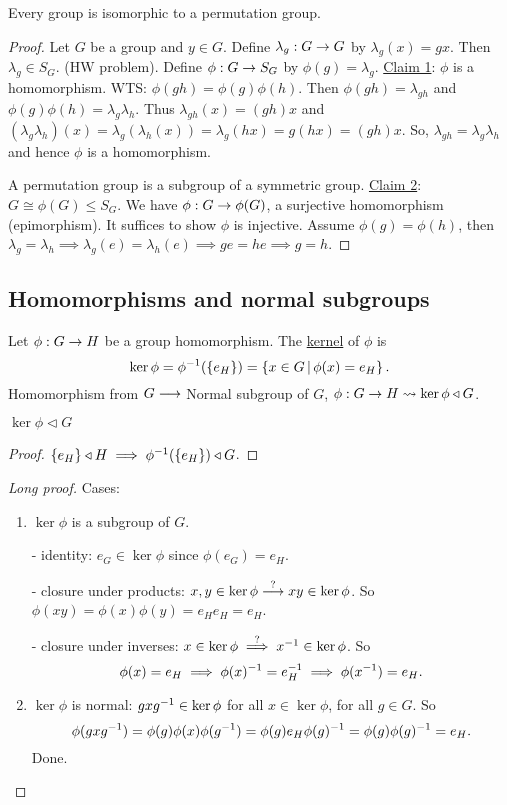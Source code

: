 \documentclass[]{article}
\begin{document}
\begin{theorem}
	Every group is isomorphic to a permutation group.
\end{theorem}
\begin{proof}
	Let $G$ be a group and $y\in G$. Define $\lambda_g:G\rightarrow G$ by $\lambda_g(x) = gx$.
	Then $\lambda_g\in S_G$. (HW problem).
	Define $\phi:G\rightarrow S_G$ by $\phi(g) = \lambda_g$.
	\ul{Claim 1}: $\phi$ is a homomorphism. WTS: $\phi(gh) = \phi(g)\phi(h)$.
	Then $\phi(gh) = \lambda_{gh}$ and $\phi(g)\phi(h) = \lambda_g\lambda_h$.
	Thus $\lambda_{gh}(x) = (gh)x$ and $(\lambda_g\lambda_h)(x) = \lambda_g(\lambda_h(x)) = \lambda_g(hx) = g(hx) = (gh)x$.
	So, $\lambda_{gh} = \lambda_g\lambda_h$ and hence $\phi$ is a homomorphism.

	A permutation group is a subgroup of a symmetric group.
	\ul{Claim 2}: $G\cong\phi(G)\leq S_G$.
	We have $\phi:G\rightarrow\phi(G)$, a surjective homomorphism (epimorphism).
	It suffices to show $\phi$ is injective.
	Assume $\phi(g) = \phi(h)$, then $\lambda_g = \lambda_h \implies \lambda_g(e) = \lambda_h(e) \implies ge = he \implies g = h$.
\end{proof}

\subsection{Homomorphisms and normal subgroups}

\begin{definition}
	Let $\phi:G\rightarrow H$ be a group homomorphism. The \ul{kernel} of $\phi$ is $$\ker\phi = \phi^{-1}(\{e_H\}) = \left\{ x\in G \, \middle| \, \phi(x)=e_H \right\}.$$
	Homomorphism from $G\longrightarrow $ Normal subgroup of $G$, $\phi:G\rightarrow H\rightsquigarrow \ker\phi\triangleleft G$.
\end{definition}
\begin{theorem}
	$\ker\phi\triangleleft G$
\end{theorem}
\begin{proof}
	$\left\{ e_H \right\}\triangleleft H\implies \phi^{-1}(\left\{ e_H \right\})\triangleleft G$.
\end{proof}
\begin{proof}
	[Long proof] Cases:
	\begin{enumerate}
		\item $\ker\phi$ is a subgroup of $G$.

			- identity: 
			$e_G\in\ker\phi$ since $\phi(e_G)=e_H$.

			- closure under products:
			$x,y\in\ker\phi\overset{?}{\longrightarrow}xy\in\ker\phi$.
			So $\phi(xy)=\phi(x)\phi(y)=e_He_H=e_H$.

			- closure under inverses:
			$x\in\ker\phi\overset{?}{\implies}x^{-1}\in\ker\phi$.
			So $$\phi(x)=e_H\implies \phi(x)^{-1} = e_H^{-1} \implies \phi(x^{-1}) = e_H.$$
		
		\item $\ker\phi$ is normal:
			$gxg^{-1}\in\ker\phi$ for all $x\in\ker\phi$, for all $g\in G$.
			So \[\phi(gxg^{-1}) = \phi(g)\phi(x)\phi(g^{-1}) = \phi(g)e_H\phi(g)^{-1} = \phi(g)\phi(g)^{-1} = e_H.\]
			Done.
	\end{enumerate}
\end{proof}
\end{document}
